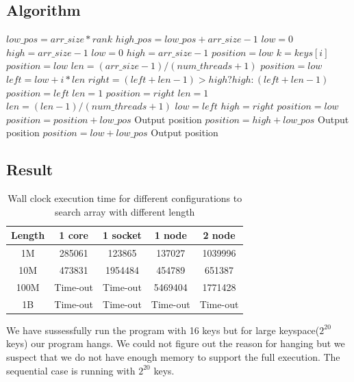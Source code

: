 \documentclass{article}
\begin{document}
\subsection{Algorithm}
\begin{algorithmic}[1]
 \label{alg:p3}
\State $low\_pos = arr\_size * rank$
\State $high\_pos = low\_pos + arr\_size - 1$
\State $low = 0$
\State $high = arr\_size - 1$
\State $low = 0$
\State $high = arr\_size - 1$
\State $position=low$
\State $k = keys[i]$
\State $position = low$
\EndIf
\EndParFor
\Else
\State $len = (arr\_size - 1)/(num\_threads + 1)$
\State $position = low$
\State $left = low + i * len$
\State $right = (left + len - 1) > high ? high : (left + len - 1)$
\State $position=left$
\State $len = 1$
\State $position=right$
\State $len=1$
\Else
{}
\State $len=(len-1)/(num\_threads + 1)$
\State $low = left$
\State $high = right$
\State $position = low$
\EndIf
\EndIf
\EndParFor
\EndWhile
\EndIf
\State $position=position+low\_pos$
\State Output position
\State $position = high + low\_pos$
\State Output position
\Else
{}
\State $position = low + low\_pos$
\State Output position
\EndIf
\EndIf
\EndFor
\EndFunction
\end{algorithmic}

\subsection{Result}
\begin{table}[h]
  \centering
  \begin{tabular}{|c|c|c|c|c|}
    \hline
    Length & 1 core & 1 socket & 1 node & 2 node \\
    \hline
    1M          &	285061	& 123865 &	137027 &
    1039996\\
    \hline
10M	& 473831 &	1954484	& 454789 &	651387\\
\hline
100M   	& Time-out &	Time-out &	5469404	& 1771428\\
\hline
1B 	& Time-out &	Time-out &	Time-out &	Time-out\\
\hline

  \end{tabular}
  \caption{Wall clock execution time for different configurations to
    search array with different length}
  \label{table:p3}
\end{table}

We have sussessfully run the program with 16 keys but for large
keyspace($2^{20}$ keys) our program hangs. We could not figure out the
reason for hanging but we suspect that we do not have enough memory to
support the full execution. The sequential case is running with
$2^{20}$ keys. 
\end{document}
